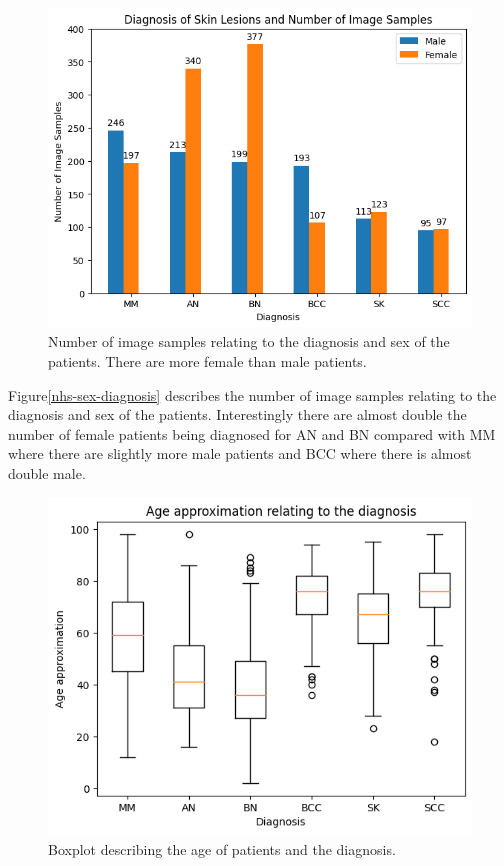 \begin{figure}
	\centering
	\includegraphics[scale=0.75]{images/nhs/nhs-sex-diagnosis.png}
	\caption{Number of image samples relating to the diagnosis and sex of the patients. There are more female than male patients.}
\end{figure}\label{nhs-sex-diagnosis}

Figure\ref{nhs-sex-diagnosis} describes the number of image samples relating to the diagnosis and sex of the patients. Interestingly there are almost double the number of female patients being diagnosed for AN and BN compared with MM where there are slightly more male patients and BCC where there is almost double male.

\begin{figure}
	\centering
	\includegraphics[scale=0.75]{images/nhs/nhs-diagnosis-age.png}
	\caption{Boxplot describing the age of patients and the diagnosis.}
\end{figure}\label{nhs-diagnosis-age}

